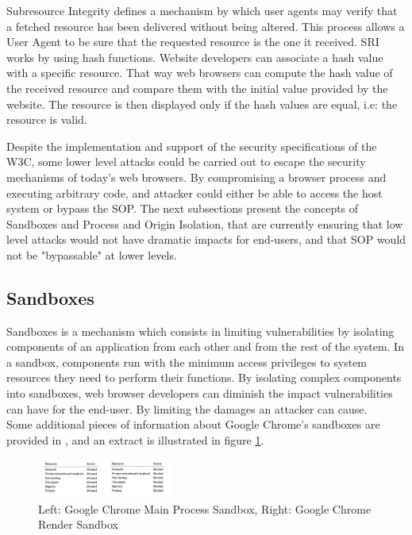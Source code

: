 \documentclass[journal]{IEEEtran}
\begin{document}
Subresource Integrity defines a mechanism by which user agents may verify that a fetched resource has been delivered without being altered. This process allows a User Agent to be sure that the requested resource is the one it received. SRI works by using hash functions. Website developers can associate a hash value with a specific resource. That way web browsers can compute the hash value of the received resource and compare them with the initial value provided by the website. The resource is then displayed only if the hash values are equal, i.e: the resource is valid. 

\medskip
\medskip

Despite the implementation and support of the security specifications of the W3C, some lower level attacks could be carried out to escape the security mechanisms of today's web browsers. By compromising a browser process and executing arbitrary code, and attacker could either be able to access the host system or bypass the SOP. The next subsections present the concepts of Sandboxes and Process and Origin Isolation, that are currently ensuring that low level attacks would not have dramatic impacts for end-users, and that SOP would not be "bypassable" at lower levels.

\subsection{Sandboxes}

Sandboxes is a mechanism which consists in limiting vulnerabilities by isolating components of an application from each other and from the rest of the system. In a sandbox, components run with the minimum access privileges to system resources they need to perform their functions.
By isolating complex components into sandboxes, web browser developers can diminish the impact vulnerabilities can have for the end-user. By limiting the damages an attacker can cause. \\

Some additional pieces of information about Google Chrome's sandboxes are provided in \cite{browserSecurityWhitePaper}, and an extract is illustrated in figure \ref{fig:ChromeSandboxes}.

\begin{figure}[h]
\centering
\includegraphics[width=0.4\textwidth]{images/SandboxesChrome.png}
\caption{Left: Google Chrome Main Process Sandbox, Right: Google Chrome Render Sandbox}
\label{fig:ChromeSandboxes}
\end{figure}
\end{document}
